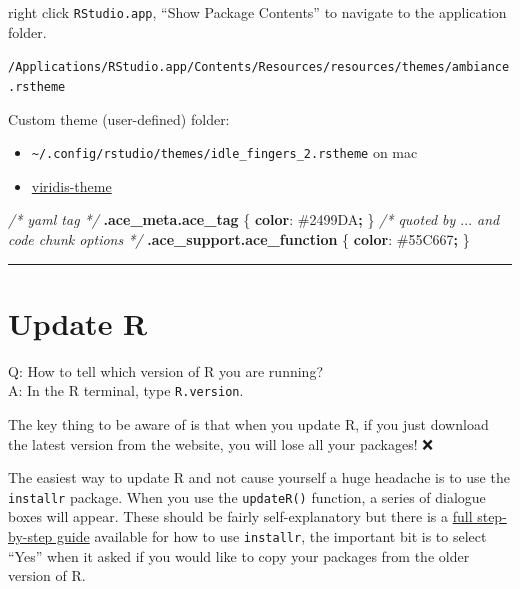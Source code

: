 \documentclass[
]{book}
\newenvironment{Shaded}{\begin{snugshade}}{\end{snugshade}}
\newcommand{\CharTok}[1]{\textcolor[rgb]{0.31,0.60,0.02}{#1}}
\newcommand{\CommentTok}[1]{\textcolor[rgb]{0.56,0.35,0.01}{\textit{#1}}}
\newcommand{\ConstantTok}[1]{\textcolor[rgb]{0.56,0.35,0.01}{#1}}
\newcommand{\FunctionTok}[1]{\textcolor[rgb]{0.13,0.29,0.53}{\textbf{#1}}}
\newcommand{\KeywordTok}[1]{\textcolor[rgb]{0.13,0.29,0.53}{\textbf{#1}}}
\newcommand{\NormalTok}[1]{#1}
\newcommand{\OperatorTok}[1]{\textcolor[rgb]{0.81,0.36,0.00}{\textbf{#1}}}
\providecommand{\tightlist}{%
  \setlength{\itemsep}{0pt}\setlength{\parskip}{0pt}}
\begin{document}
right click \texttt{RStudio.app}, ``Show Package Contents'' to navigate to the application folder.

\texttt{/Applications/RStudio.app/Contents/Resources/resources/themes/ambiance.rstheme}

Custom theme (user-defined) folder:

\begin{itemize}
\tightlist
\item
  \texttt{\textasciitilde{}/.config/rstudio/themes/idle\_fingers\_2.rstheme} on mac
\item
  \href{https://github.com/z3tt/viridis-theme/blob/main/viridis.rstheme}{viridis-theme}
\end{itemize}

\begin{Shaded}
\begin{Highlighting}[]
\CommentTok{/* yaml tag */}
\FunctionTok{.ace\_meta.ace\_tag}\NormalTok{ \{}
  \KeywordTok{color}\CharTok{:} \ConstantTok{\#2499DA}\OperatorTok{;}
\NormalTok{\}}
\CommentTok{/* quoted by $...$ and code chunk options */}
\FunctionTok{.ace\_support.ace\_function}\NormalTok{ \{}
  \KeywordTok{color}\CharTok{:} \ConstantTok{\#55C667}\OperatorTok{;}
\NormalTok{\}}
\end{Highlighting}
\end{Shaded}

\begin{center}\rule{0.5\linewidth}{0.5pt}\end{center}

\section{Update R}\label{update-r}

Q: How to tell which version of R you are running?\\
A: In the R terminal, type \texttt{R.version}.

The key thing to be aware of is that when you update R, {if you just download the latest version from the website, you will lose all your packages!} ❌

The easiest way to update R and not cause yourself a huge headache is to use the \texttt{installr} package. When you use the \texttt{updateR()} function, a series of dialogue boxes will appear. These should be fairly self-explanatory but there is a \href{https://www.r-statistics.com/2015/06/a-step-by-step-screenshots-tutorial-for-upgrading-r-on-windows/\#google_vignette}{full step-by-step guide} available for how to use \texttt{installr}, the important bit is to {select ``Yes'' when it asked if you would like to copy your packages from the older version of R}.
\end{document}
